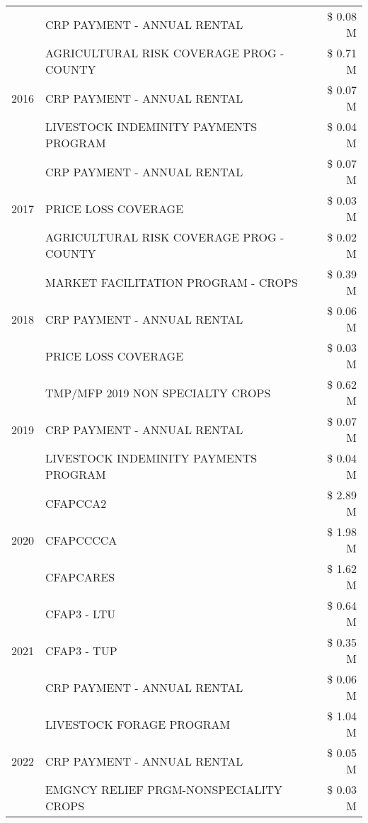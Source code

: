 \begin{tabular}{llr}
 & CRP PAYMENT - ANNUAL RENTAL & \$ 0.08 M \\
\cline{1-3}
\multirow[t]{3}{*}{2016} & AGRICULTURAL RISK COVERAGE PROG - COUNTY & \$ 0.71 M \\
 & CRP PAYMENT - ANNUAL RENTAL & \$ 0.07 M \\
 & LIVESTOCK INDEMINITY PAYMENTS PROGRAM & \$ 0.04 M \\
\cline{1-3}
\multirow[t]{3}{*}{2017} & CRP PAYMENT - ANNUAL RENTAL & \$ 0.07 M \\
 & PRICE LOSS COVERAGE & \$ 0.03 M \\
 & AGRICULTURAL RISK COVERAGE PROG - COUNTY & \$ 0.02 M \\
\cline{1-3}
\multirow[t]{3}{*}{2018} & MARKET FACILITATION PROGRAM - CROPS & \$ 0.39 M \\
 & CRP PAYMENT - ANNUAL RENTAL & \$ 0.06 M \\
 & PRICE LOSS COVERAGE & \$ 0.03 M \\
\cline{1-3}
\multirow[t]{3}{*}{2019} & TMP/MFP 2019 NON SPECIALTY CROPS & \$ 0.62 M \\
 & CRP PAYMENT - ANNUAL RENTAL & \$ 0.07 M \\
 & LIVESTOCK INDEMINITY PAYMENTS PROGRAM & \$ 0.04 M \\
\cline{1-3}
\multirow[t]{3}{*}{2020} & CFAPCCA2 & \$ 2.89 M \\
 & CFAPCCCCA & \$ 1.98 M \\
 & CFAPCARES & \$ 1.62 M \\
\cline{1-3}
\multirow[t]{3}{*}{2021} & CFAP3 - LTU & \$ 0.64 M \\
 & CFAP3 - TUP & \$ 0.35 M \\
 & CRP PAYMENT - ANNUAL RENTAL & \$ 0.06 M \\
\cline{1-3}
\multirow[t]{3}{*}{2022} & LIVESTOCK FORAGE PROGRAM & \$ 1.04 M \\
 & CRP PAYMENT - ANNUAL RENTAL & \$ 0.05 M \\
 & EMGNCY RELIEF PRGM-NONSPECIALITY CROPS & \$ 0.03 M \\
\cline{1-3}
\bottomrule
\end{tabular}
